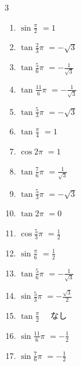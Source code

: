 \begin{multicols}{3}
\begin{enumerate}
  \item $\displaystyle \sin{\frac{\pi}{2}}$
        $\displaystyle =1$

  \item $\displaystyle \tan{\frac{2}{3}\pi}$
        $\displaystyle =-\sqrt{3}$

  \item $\displaystyle \tan{\frac{5}{6}\pi}$
        $\displaystyle =-\frac{1}{\sqrt{3}}$

  \item $\displaystyle \tan{\frac{11}{6}\pi}$
        $\displaystyle =-\frac{1}{\sqrt{3}}$

  \item $\displaystyle \tan{\frac{5}{3}\pi}$
        $\displaystyle =-\sqrt{3}$

  \item $\displaystyle \tan{\frac{\pi}{4}}$
        $\displaystyle =1$

  \item $\displaystyle \cos{2\pi}$
        $\displaystyle =1$

  \item $\displaystyle \tan{\frac{7}{6}\pi}$
        $\displaystyle =\frac{1}{\sqrt{3}}$

  \item $\displaystyle \tan{\frac{5}{3}\pi}$
        $\displaystyle =-\sqrt{3}$

  \item $\displaystyle \tan{2\pi}$
        $\displaystyle =0$

  \item $\displaystyle \cos{\frac{5}{3}\pi}$
        $\displaystyle =\frac{1}{2}$

  \item $\displaystyle \sin{\frac{\pi}{6}}$
        $\displaystyle =\frac{1}{2}$

  \item $\displaystyle \tan{\frac{5}{6}\pi}$
        $\displaystyle =-\frac{1}{\sqrt{3}}$

  \item $\displaystyle \sin{\frac{5}{3}\pi}$
        $\displaystyle =-\frac{\sqrt{3}}{2}$

  \item $\displaystyle \tan{\frac{\pi}{2}}$
        $\displaystyle \quad なし$

  \item $\displaystyle \sin{\frac{11}{6}\pi}$
        $\displaystyle =-\frac{1}{2}$

  \item $\displaystyle \sin{\frac{7}{6}\pi}$
        $\displaystyle =-\frac{1}{2}$


\end{enumerate}
\end{multicols}
